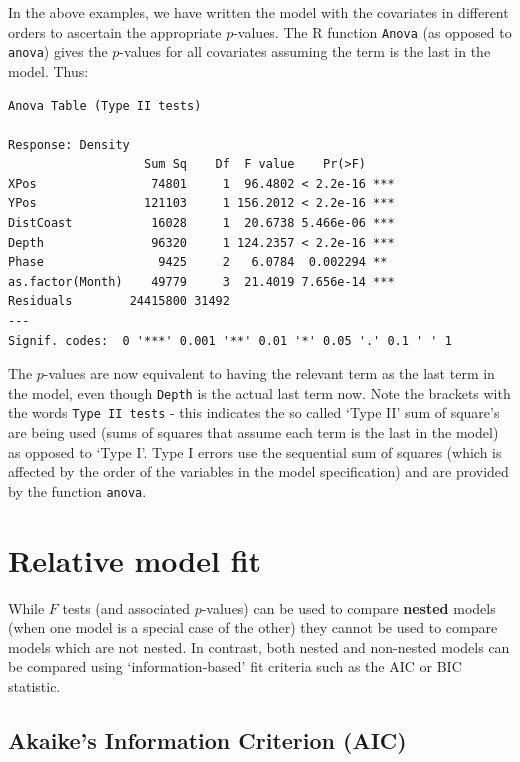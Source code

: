 \documentclass[
  oneside]{krantz}
\begin{document}
In the above examples, we have written the model with the covariates in different orders to ascertain the appropriate \(p\)-values. The R function \texttt{Anova} (as opposed to \texttt{anova}) gives the \(p\)-values for all covariates assuming the term is the last in the model. Thus:

\begin{verbatim}
Anova Table (Type II tests)

Response: Density
                   Sum Sq    Df  F value    Pr(>F)    
XPos                74801     1  96.4802 < 2.2e-16 ***
YPos               121103     1 156.2012 < 2.2e-16 ***
DistCoast           16028     1  20.6738 5.466e-06 ***
Depth               96320     1 124.2357 < 2.2e-16 ***
Phase                9425     2   6.0784  0.002294 ** 
as.factor(Month)    49779     3  21.4019 7.656e-14 ***
Residuals        24415800 31492                       
---
Signif. codes:  0 '***' 0.001 '**' 0.01 '*' 0.05 '.' 0.1 ' ' 1
\end{verbatim}

The \(p\)-values are now equivalent to having the relevant term as the last term in the model, even though \texttt{Depth} is the actual last term now. Note the brackets with the words \texttt{Type\ II\ tests} - this indicates the so called `Type II' sum of square's are being used (sums of squares that assume each term is the last in the model) as opposed to `Type I'. Type I errors use the sequential sum of squares (which is affected by the order of the variables in the model specification) and are provided by the function \texttt{anova}.

\hypertarget{relative-model-fit}{%
\section{Relative model fit}\label{relative-model-fit}}

While \(F\) tests (and associated \(p\)-values) can be used to compare \textbf{nested} models (when one model is a special case of the other) they cannot be used to compare models which are not nested. In contrast, both nested and non-nested models can be compared using `information-based' fit criteria such as the AIC or BIC statistic.

\hypertarget{akaikes-information-criterion-aic}{%
\subsection{Akaike's Information Criterion (AIC)}\label{akaikes-information-criterion-aic}}
\end{document}
